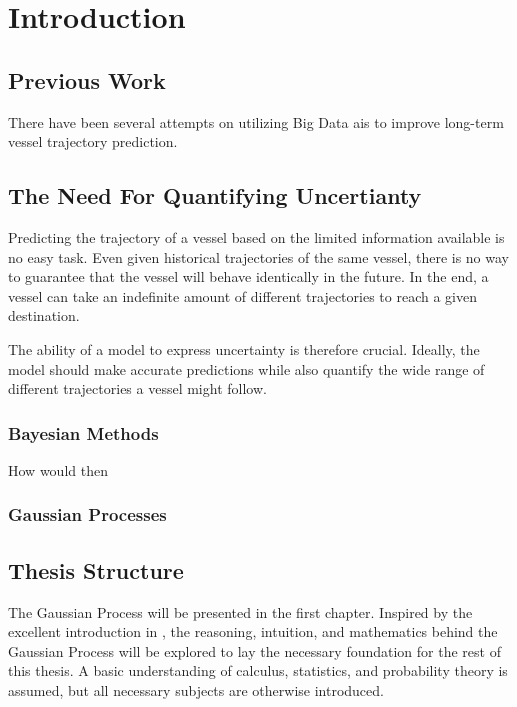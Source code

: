 \chapter{Introduction}
\section{Previous Work}
There have been several attempts on utilizing Big Data \acrshort{ais} to improve long-term vessel trajectory prediction. 



\section{The Need For Quantifying Uncertianty}
Predicting the trajectory of a vessel based on the limited information available is no easy task. Even given historical trajectories of the same vessel, there is no way to guarantee that the vessel will behave identically in the future. In the end, a vessel can take an indefinite amount of different trajectories to reach a given destination. 

The ability of a model to express uncertainty is therefore crucial. Ideally, the model should make accurate predictions while also quantify the wide range of different trajectories a vessel might follow. 

\subsection{Bayesian Methods}
How would then 
\subsection{Gaussian Processes}

\section{Thesis Structure}
The Gaussian Process will be presented in the first chapter. Inspired by the excellent introduction in \cite{rasmussen}, the reasoning, intuition, and mathematics behind the Gaussian Process will be explored to lay the necessary foundation for the rest of this thesis. A basic understanding of calculus, statistics, and probability theory is assumed, but all necessary subjects are otherwise introduced.  

